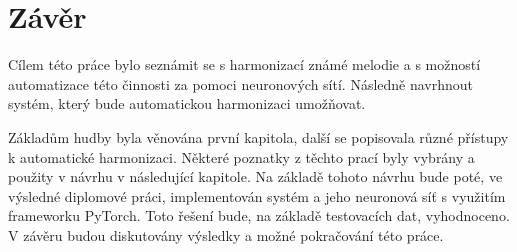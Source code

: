 \chapter{Závěr}
\label{zaver}
Cílem této práce bylo seznámit se s harmonizací známé melodie a s možností automatizace této činnosti za pomoci neuronových sítí.
Následně navrhnout systém, který bude automatickou harmonizaci umožňovat.
\par

Základům hudby byla věnována první kapitola, 
další se popisovala různé přístupy k automatické harmonizaci. Některé poznatky z těchto prací byly vybrány a použity v návrhu v následující kapitole.
Na základě tohoto návrhu bude poté, ve výsledné diplomové práci, implementován systém a jeho neuronová síť s využitím frameworku PyTorch.
Toto řešení bude, na základě testovacích dat, vyhodnoceno.
V závěru budou diskutovány výsledky a možné pokračování této práce.
